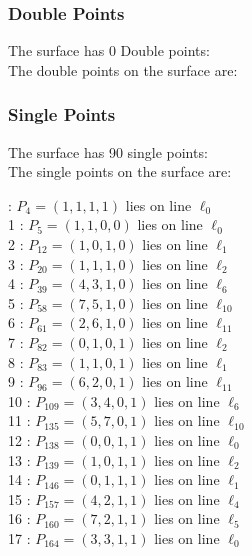 \documentclass{article}
\begin{document}
{\subsubsection*{Double Points}
The surface has 0 Double points:\\
The double points on the surface are:\\
\begin{multicols}{2}
\noindent
\end{multicols}
\subsubsection*{Single Points}
The surface has 90 single points:\\
The single points on the surface are:\\
\begin{multicols}{2}
 : $P_{4}=( 1, 1, 1, 1 )$ lies on line $\ell_{0}$\\
1 : $P_{5}=( 1, 1, 0, 0 )$ lies on line $\ell_{0}$\\
2 : $P_{12}=( 1, 0, 1, 0 )$ lies on line $\ell_{1}$\\
3 : $P_{20}=( 1, 1, 1, 0 )$ lies on line $\ell_{2}$\\
4 : $P_{39}=( 4, 3, 1, 0 )$ lies on line $\ell_{6}$\\
5 : $P_{58}=( 7, 5, 1, 0 )$ lies on line $\ell_{10}$\\
6 : $P_{61}=( 2, 6, 1, 0 )$ lies on line $\ell_{11}$\\
7 : $P_{82}=( 0, 1, 0, 1 )$ lies on line $\ell_{2}$\\
8 : $P_{83}=( 1, 1, 0, 1 )$ lies on line $\ell_{1}$\\
9 : $P_{96}=( 6, 2, 0, 1 )$ lies on line $\ell_{11}$\\
10 : $P_{109}=( 3, 4, 0, 1 )$ lies on line $\ell_{6}$\\
11 : $P_{135}=( 5, 7, 0, 1 )$ lies on line $\ell_{10}$\\
12 : $P_{138}=( 0, 0, 1, 1 )$ lies on line $\ell_{0}$\\
13 : $P_{139}=( 1, 0, 1, 1 )$ lies on line $\ell_{2}$\\
14 : $P_{146}=( 0, 1, 1, 1 )$ lies on line $\ell_{1}$\\
15 : $P_{157}=( 4, 2, 1, 1 )$ lies on line $\ell_{4}$\\
16 : $P_{160}=( 7, 2, 1, 1 )$ lies on line $\ell_{5}$\\
17 : $P_{164}=( 3, 3, 1, 1 )$ lies on line $\ell_{0}$\\

\end{multicols}}
\end{document}
